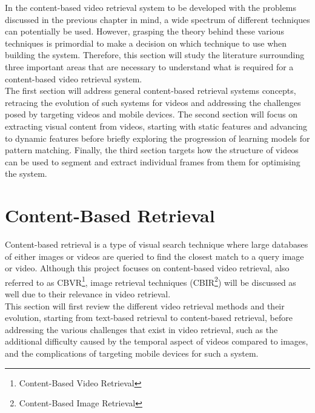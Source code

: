 In the content-based video retrieval system to be developed with the problems discussed in the previous chapter in mind, a wide spectrum of different techniques can potentially be used. However, grasping the theory behind these various techniques is primordial to make a decision on which technique to use when building the system. Therefore, this section will study the literature surrounding three important areas that are necessary to understand what is required for a content-based video retrieval system.\\

The first section will address general content-based retrieval systems concepts, retracing the evolution of such systems for videos and addressing the challenges posed by targeting videos and mobile devices. The second section will focus on extracting visual content from videos, starting with static features and advancing to dynamic features before briefly exploring the progression of learning models for pattern matching. Finally, the third section targets how the structure of videos can be used to segment and extract individual frames from them for optimising the system.

\section{Content-Based Retrieval}

Content-based retrieval is a type of visual search technique where large databases of either images or videos are queried to find the closest match to a query image or video. Although this project focuses on content-based video retrieval, also referred to as CBVR\footnote{Content-Based Video Retrieval}, image retrieval techniques (CBIR\footnote{Content-Based Image Retrieval}) will be discussed as well due to their relevance in video retrieval.\\

This section will first review the different video retrieval methods and their evolution, starting from text-based retrieval to content-based retrieval, before addressing the various challenges that exist in video retrieval, such as the additional difficulty caused by the temporal aspect of videos compared to images, and the complications of targeting mobile devices for such a system.


